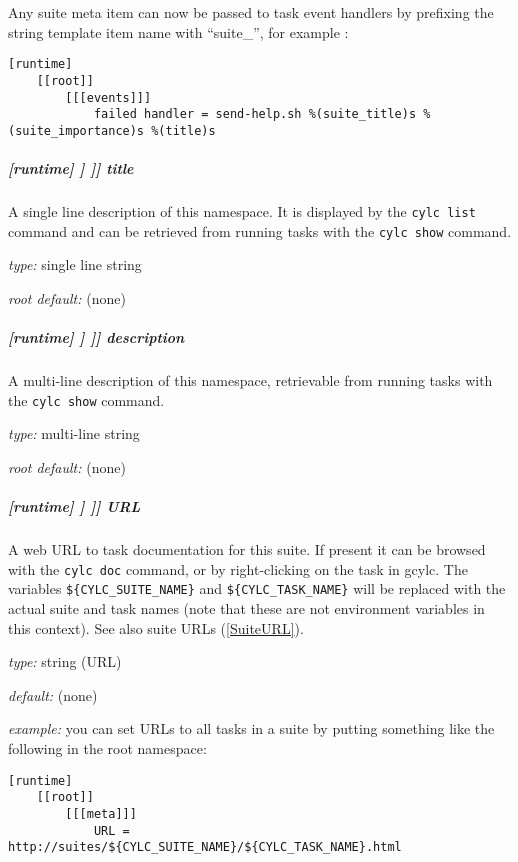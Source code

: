 Any suite meta item can now be passed to task event handlers by prefixing the
string template item name with ``suite\_'', for example : 

\begin{lstlisting}
[runtime]
    [[root]]
        [[[events]]]
            failed handler = send-help.sh %(suite_title)s %(suite_importance)s %(title)s
\end{lstlisting}

\subparagraph[title]{[runtime] \textrightarrow [[\_\_NAME\_\_]] \textrightarrow [[[meta]]] \textrightarrow title}

A single line description of this namespace. It is displayed by the
\lstinline=cylc list= command and can be retrieved from running tasks
with the \lstinline=cylc show= command.

\begin{myitemize}
\item {\em type:} single line string
\item {\em root default:} (none)
\end{myitemize}

\subparagraph[description]{[runtime] \textrightarrow [[\_\_NAME\_\_]] \textrightarrow [[[meta]]] \textrightarrow description}

A multi-line description of this namespace, retrievable from running tasks with the
\lstinline=cylc show= command.

\begin{myitemize}
\item {\em type:} multi-line string
\item {\em root default:} (none)
\end{myitemize}

\subparagraph[URL]{[runtime] \textrightarrow [[\_\_NAME\_\_]] \textrightarrow [[[meta]]] \textrightarrow URL}
\label{TaskURL}

A web URL to task documentation for this suite.  If present it can be browsed
with the \lstinline=cylc doc= command, or by right-clicking on the task in
gcylc.  The variables \lstinline=${CYLC_SUITE_NAME}= and
\lstinline=${CYLC_TASK_NAME}= will be replaced with the actual suite and task
names (note that these are not environment variables in this context). See also
suite URLs (\ref{SuiteURL}).

\begin{myitemize}
\item {\em type:} string (URL)
\item {\em default:} (none)
\item {\em example:} you can set URLs to all tasks in a suite by putting
    something like the following in the root namespace:
    \begin{lstlisting}
[runtime]
    [[root]]
        [[[meta]]]
            URL = http://suites/${CYLC_SUITE_NAME}/${CYLC_TASK_NAME}.html
    \end{lstlisting}
\end{myitemize}

